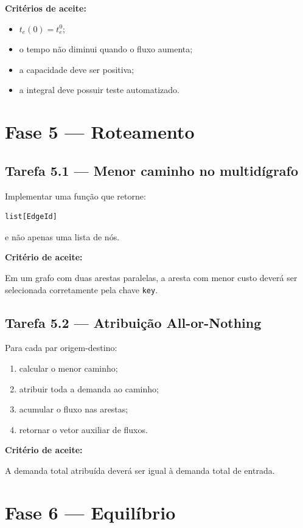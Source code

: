 \documentclass[12pt,a4paper]{article}
\begin{document}
\textbf{Critérios de aceite:}

\begin{itemize}
    \item \(t_e(0)=t_e^0\);
    \item o tempo não diminui quando o fluxo aumenta;
    \item a capacidade deve ser positiva;
    \item a integral deve possuir teste automatizado.
\end{itemize}

\section{Fase 5 --- Roteamento}

\subsection{Tarefa 5.1 --- Menor caminho no multidígrafo}

Implementar uma função que retorne:

\begin{verbatim}
list[EdgeId]
\end{verbatim}

e não apenas uma lista de nós.

\textbf{Critério de aceite:}

Em um grafo com duas arestas paralelas, a aresta com menor custo deverá ser
selecionada corretamente pela chave \texttt{key}.

\subsection{Tarefa 5.2 --- Atribuição All-or-Nothing}

Para cada par origem-destino:

\begin{enumerate}
    \item calcular o menor caminho;
    \item atribuir toda a demanda ao caminho;
    \item acumular o fluxo nas arestas;
    \item retornar o vetor auxiliar de fluxos.
\end{enumerate}

\textbf{Critério de aceite:}

A demanda total atribuída deverá ser igual à demanda total de entrada.

\section{Fase 6 --- Equilíbrio}
\end{document}
